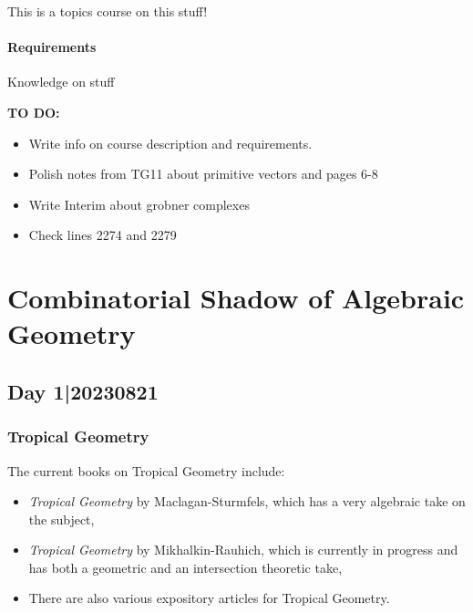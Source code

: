 \documentclass[12pt]{memoir}
\theoremstyle{definition}
\begin{document}
\maketitle
{\small 
\setlength{\parindent}{0em}
\setlength{\parskip}{1em}

This is a topics course on this stuff!

\subsubsection*{Requirements}
Knowledge on stuff\par 

\textbf{TO DO:}
\begin{itemize}
    \item Write info on course description and requirements.
    \item Polish notes from TG11 about primitive vectors and pages 6-8
    \item Write Interim about grobner complexes
    \item Check lines 2274 and 2279
\end{itemize}
}
\newpage
\tableofcontents
\chapter{Combinatorial Shadow of Algebraic Geometry}

\section{Day 1|20230821}

\subsection{Tropical Geometry}

The current books on Tropical Geometry include:
\begin{itemize}
    \item \emph{Tropical Geometry} by Maclagan-Sturmfels, which has a very algebraic take on the subject,
    \item \emph{Tropical Geometry} by Mikhalkin-Rauhich, which is currently in progress and has both a geometric and an intersection theoretic take,
    \item There are also various expository articles for Tropical Geometry.
\end{itemize}
\end{document}
